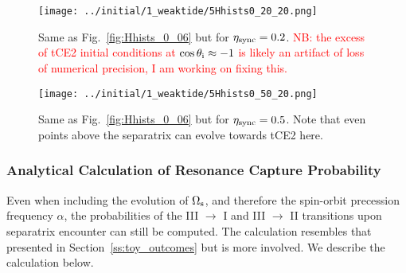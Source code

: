 \documentclass[
        fleqn,
        usenatbib,
        referee,
    ]{mnras}
\newlength{\colummwidth}
\begin{document}
\begin{figure}
    \centering
    \texttt{[image: ../initial/1\_weaktide/5Hhists0\_20\_20.png]}
    \caption{Same as Fig.~\ref{fig:Hhists_0_06} but for $\eta_{\rm sync} =
    0.2$.
    \textcolor{red}{NB\@: the excess of tCE2 initial conditions at $\cos
    \theta_{\rm i} \approx -1$ is likely an artifact of loss of numerical
    precision, I am working on fixing this.}
    }\label{fig:Hhists_0_20}
\end{figure}
\begin{figure}
    \centering
    \texttt{[image: ../initial/1\_weaktide/5Hhists0\_50\_20.png]}
    \caption{Same as Fig.~\ref{fig:Hhists_0_06} but for $\eta_{\rm sync} =
    0.5$. Note that even points above the separatrix can evolve towards tCE2
    here.}\label{fig:Hhists_0_50}
\end{figure}

\subsubsection{Analytical Calculation of Resonance Capture Probability
}\label{ss:phop_weaktide}

Even when including the evolution of $\Omega_{\rm s}$, and therefore the
spin-orbit precession frequency $\alpha$, the probabilities of the III $\to$ I
and III $\to$ II transitions upon separatrix encounter can still be computed.
The calculation resembles that presented in Section~\ref{ss:toy_outcomes} but is
more involved. We describe the calculation below.
\end{document}
